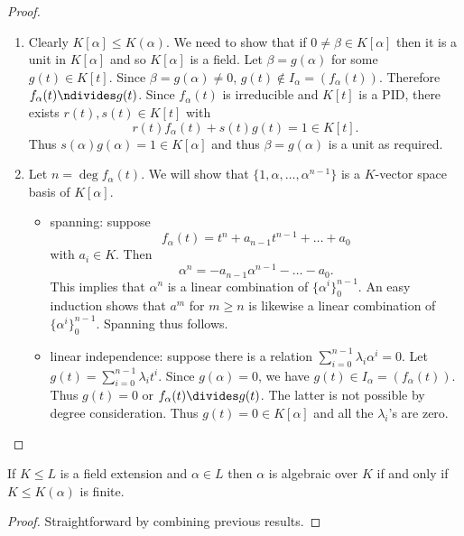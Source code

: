\documentclass[a4paper]{article}
\begin{document}
\begin{proof}\leavevmode
  \begin{enumerate}
  \item Clearly \(K[\alpha] \leq K(\alpha)\). We need to show that if \(0 \neq \beta \in K[\alpha]\) then it is a unit in \(K[\alpha]\) and so \(K[\alpha]\) is a field. Let \(\beta = g(\alpha)\) for some \(g(t) \in K[t]\). Since \(\beta = g(\alpha) \neq 0\), \(g(t) \notin I_\alpha = (f_\alpha(t))\). Therefore \(f_\alpha(t) \ndivides g(t)\). Since \(f_\alpha(t)\) is irreducible and \(K[t]\) is a PID, there exists \(r(t), s(t) \in K[t]\) with
    \[
      r(t)f_\alpha(t) + s(t)g(t) = 1 \in K[t].
    \]
    Thus \(s(\alpha)g(\alpha) = 1 \in K[\alpha]\) and thus \(\beta = g(\alpha)\) is a unit as required.
  \item Let \(n = \deg f_\alpha(t)\). We will show that \(\{1, \alpha, \dots, \alpha^{n - 1}\}\) is a \(K\)-vector space basis of \(K[\alpha]\).
    \begin{itemize}
    \item spanning: suppose
      \[
        f_\alpha(t) = t^n + a_{n - 1}t^{n - 1} + \dots + a_0
      \]
      with \(a_i \in K\). Then
      \[
        \alpha^n = -a_{n - 1}\alpha^{n - 1} - \dots - a_0.
      \]
      This implies that \(\alpha^n\) is a linear combination of \(\{\alpha^i\}^{n - 1}_0\). An easy induction shows that \(a^m\) for \(m \geq n\) is likewise a linear combination of \(\{\alpha^i\}^{n - 1}_0\). Spanning thus follows.
    \item linear independence: suppose there is a relation \(\sum_{i = 0}^{n - 1} \lambda_{i}\alpha^i = 0\). Let \(g(t) = \sum_{i = 0}^{n - 1}\lambda_it^i\). Since \(g(\alpha) = 0\), we have \(g(t) \in I_\alpha = (f_\alpha(t))\). Thus \(g(t) = 0\) or \(f_\alpha(t) \divides g(t)\). The latter is not possible by degree consideration. Thus \(g(t) = 0 \in K[\alpha]\) and all the \(\lambda_i\)'s are zero.
    \end{itemize}
  \end{enumerate}
\end{proof}

\begin{corollary}
  If \(K \leq L\) is a field extension and \(\alpha \in L\) then \(\alpha\) is algebraic over \(K\) if and only if \(K \leq K(\alpha)\) is finite.
\end{corollary}

\begin{proof}
  Straightforward by combining previous results.
\end{proof}
\end{document}

